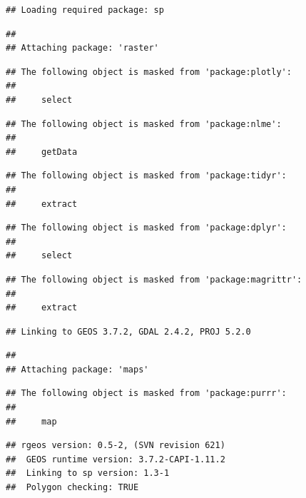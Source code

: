 \documentclass[
]{article}
\begin{document}
\begin{verbatim}
## Loading required package: sp
\end{verbatim}

\begin{verbatim}
## 
## Attaching package: 'raster'
\end{verbatim}

\begin{verbatim}
## The following object is masked from 'package:plotly':
## 
##     select
\end{verbatim}

\begin{verbatim}
## The following object is masked from 'package:nlme':
## 
##     getData
\end{verbatim}

\begin{verbatim}
## The following object is masked from 'package:tidyr':
## 
##     extract
\end{verbatim}

\begin{verbatim}
## The following object is masked from 'package:dplyr':
## 
##     select
\end{verbatim}

\begin{verbatim}
## The following object is masked from 'package:magrittr':
## 
##     extract
\end{verbatim}

\begin{verbatim}
## Linking to GEOS 3.7.2, GDAL 2.4.2, PROJ 5.2.0
\end{verbatim}

\begin{verbatim}
## 
## Attaching package: 'maps'
\end{verbatim}

\begin{verbatim}
## The following object is masked from 'package:purrr':
## 
##     map
\end{verbatim}

\begin{verbatim}
## rgeos version: 0.5-2, (SVN revision 621)
##  GEOS runtime version: 3.7.2-CAPI-1.11.2 
##  Linking to sp version: 1.3-1 
##  Polygon checking: TRUE
\end{verbatim}
\end{document}
